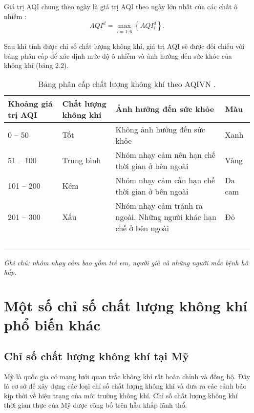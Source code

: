\documentclass[14pt]{extreport}
\theoremstyle{definition}
\theoremstyle{plain}
\theoremstyle{remark}
\begin{document}
Giá trị AQI chung theo ngày là giá trị AQI theo ngày lớn nhất của các chất ô nhiễm \cite{TCMT2011}:
\begin{equation}
AQI^d = \max_{i=\overline{1,6}}\left\lbrace AQI_i^d \right\rbrace.
\end{equation}


Sau khi tính được chỉ số chất lượng không khí, giá trị AQI sẽ được đối chiếu với bảng phân cấp để xác định mức độ ô nhiễm và ảnh hưởng đến sức khỏe của không khí (bảng 2.2).

\begin{table}
\begin{tabular}{|p{2.5cm}||p{2.5cm}||p{7.2cm}||p{2cm}|} 
 \hline
Khoảng giá trị AQI &Chất lượng không khí & Ảnh hưởng đến sức khỏe &Màu \\
 \hline\hline \rowcolor{green}
0 – 50 & Tốt & Không ảnh hưởng đến sức khỏe &{Xanh}\\
 \hline \rowcolor{yellow}
51 – 100 & Trung bình &	Nhóm nhạy cảm nên hạn chế thời gian ở bên ngoài	& Vàng\\
 \hline \rowcolor{orange}
101 – 200 &	Kém	& Nhóm nhạy cảm cần hạn chế thời gian ở bên ngoài	& Da cam\\
 \hline \rowcolor{red}
 201 – 300  &  Xấu	& Nhóm nhạy cảm tránh ra ngoài. Những người khác hạn chế ở bên ngoài	& Đỏ\\ 
 \hline \rowcolor{brown}
\textcolor{white}{Trên 300} &	\textcolor{white}{Nguy hại}	& \textcolor{white}{Mọi người nên ở trong nhà} &	\textcolor{white}{Nâu}\\
 \hline
\end{tabular}
\caption{Bảng phân cấp chất lượng không khí theo AQIVN \cite{TCMT2011}.}
\textit{\small{Ghi chú: nhóm nhạy cảm bao gồm trẻ em, người già và những người mắc bệnh hô hấp.}}
\end{table}

\section{Một số chỉ số chất lượng không khí phổ biến khác}
\subsection{Chỉ số chất lượng không khí tại Mỹ}
Mỹ là quốc gia có mạng lưới quan trắc không khí rất hoàn chỉnh và đồng bộ. Đây là cơ sở để xây dựng các loại chỉ số chất lượng không khí và đưa ra các cảnh báo kịp thời về hiện trạng của môi trường không khí. Chỉ số chất lượng không khí thời gian thực của Mỹ được công bố trên hầu khắp lãnh thổ.
		
\end{document}
